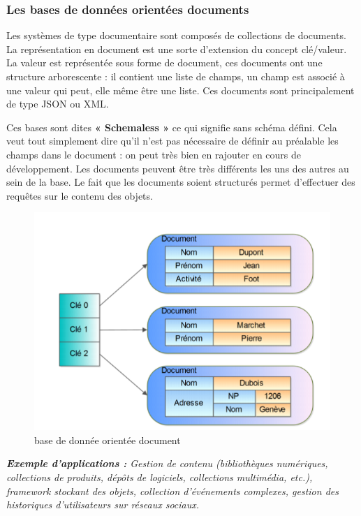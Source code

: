 \subsubsection{Les bases de données orientées documents}
Les systèmes de type documentaire sont composés de collections de documents. La représentation en document est une sorte d’extension du concept clé/valeur. La valeur est représentée sous forme de document, ces documents ont une structure arborescente : il contient une liste de champs, un champ est associé à une valeur qui peut, elle même être une liste. Ces documents sont principalement de type JSON ou XML.

Ces bases sont dites \textbf{« Schemaless »} ce qui signifie sans schéma défini. Cela veut tout simplement dire qu’il n’est pas nécessaire de définir au préalable les champs dans le document : on peut très bien en rajouter en cours de développement. Les documents peuvent être très différents les uns des autres au sein de la base. Le fait que les documents soient structurés permet d’effectuer des requêtes sur le contenu des objets.

\begin{figure}[h]
	\centering
    \includegraphics[scale=0.5]{img/part1/4.5}
    \caption{base de donnée orientée document}
\end{figure}

\textit{\textbf{Exemple d'applications :} Gestion de contenu (bibliothèques numériques, collections de produits, dépôts de logiciels, collections multimédia, etc.), framework stockant des objets, collection d'événements complexes, gestion des historiques d'utilisateurs sur réseaux sociaux.}


